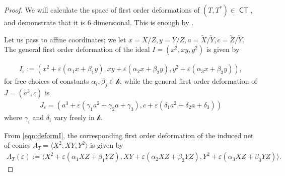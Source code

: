 \documentclass{article}
\renewcommand{\k}{\mathscr{k}}
\DeclareMathOperator{\CT}{\mathsf{CT}}
\begin{document}
\begin{proof}
  We will calculate the space of first order deformations of
  $(T, T^{*}) \in \CT$, and demonstrate that it is $6$ dimensional. This is enough by .

  Let us pass to affine coordinates; we let
  $x = X/Z, y = Y/Z, a = \check{X}/\check{Y}, c = \check{Z}/\check{Y}$. The general first order
  deformation of the ideal $I = (x^{2},xy,y^{2})$ is given by

\begin{eqnarray}\label{eqn:deformI}
  I_{\varepsilon} := (x^{2} + \varepsilon(\alpha_{1}x + \beta_{1}y), xy + \varepsilon(\alpha_{2}x + \beta_{2}y), y^{2}+ \varepsilon(\alpha_{3}x+\beta_{3}y)),
\end{eqnarray}
for free choices of constants $\alpha_{i}, \beta_{j} \in \k$, while the
general first order deformation of $J = (a^{3}, c)$ is
\begin{eqnarray}\label{eqn:deformJ}
  J_{\varepsilon} = (a^{3} + \varepsilon(\gamma_{1}a^{2}+\gamma_{2}a+\gamma_{3}), c + \varepsilon(\delta_{1}a^{2}+\delta_{2}a + \delta_{3}))
\end{eqnarray}
where $\gamma_{i}$ and $\delta_{i}$ vary freely in $\k$.

From \eqref{eqn:deformI}, the corresponding first order deformation of
the induced net of conics
$\Lambda_{T} = \langle X^{2}, XY, Y^{2} \rangle$ is given by
\begin{eqnarray}\label{eqn:deformnet}
  \Lambda_{T}(\varepsilon) := \langle X^{2} + \varepsilon(\alpha_{1}XZ + \beta_{1}YZ), XY + \varepsilon(\alpha_{2}XZ + \beta_{2}YZ), Y^{2}+ \varepsilon(\alpha_{3}XZ+\beta_{3}YZ) \rangle.
\end{eqnarray}


\end{proof}
\end{document}
